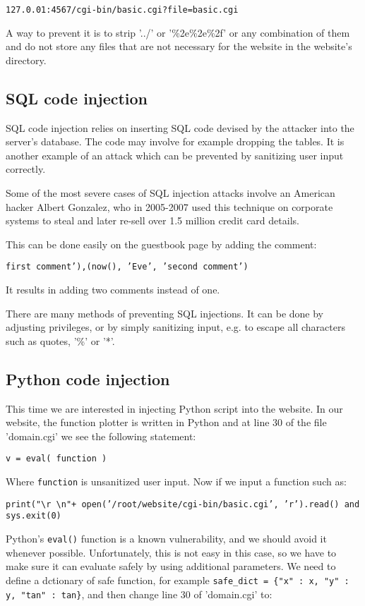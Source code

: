 \documentclass[11pt,journal]{article}
\begin{document}
	\texttt{127.0.01:4567/cgi-bin/basic.cgi?file=basic.cgi}
	
	A way to prevent it is to strip '../' or '\%2e\%2e\%2f' or any combination of them and do not store any files that are not necessary for the website in the website's directory.
	
	
	\subsection{SQL code injection}
	SQL code injection relies on inserting SQL code devised by the attacker into the server's database. The code may involve for example dropping the tables. It is another example of an attack which can be prevented by sanitizing user input correctly.
	
	Some of the most severe cases of SQL injection attacks involve an American hacker Albert Gonzalez, who in 2005-2007 used this technique on corporate systems to steal and later re-sell over 1.5 million credit card details\cite{Gonzalez}.
	
	This can be done easily on the guestbook page by adding the comment: 
	
	\texttt{first comment'),(now(), 'Eve', 'second comment')}
	
	It results in adding two comments instead of one.
	
	There are many methods of preventing SQL injections. It can be done by adjusting privileges, or by simply sanitizing input, e.g. to escape all characters such as quotes, '\%' or '*'.
	
	
	\subsection{Python code injection}
	This time we are interested in injecting Python script into the website. In our website, the function plotter is written in Python and at line 30 of the file 'domain.cgi' we see the following statement:
	
	\texttt{v = eval( function )}
	
	Where \texttt{function} is unsanitized user input. Now if we input a function such as:
	
	\texttt{print("\textbackslash r \textbackslash n"+ open('/root/website/cgi-bin/basic.cgi', 'r').read() and sys.exit(0)}
	
	Python's \texttt{eval()} function is a known vulnerability, and we should avoid it whenever possible. Unfortunately, this is not easy in this case, so we have to make sure it can evaluate safely by using additional parameters. We need to define a dctionary of safe function, for example \texttt{safe\_dict = \{"x" : x, "y" : y, "tan" : tan\}}, and then change line 30 of 'domain.cgi' to:
	
\end{document}
